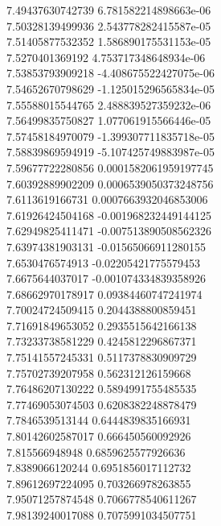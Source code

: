 {7.49437630742739 6.781582214898663e-06 \\
7.50328139499936 2.543778282415587e-05 \\
7.51405877532352 1.586890175531153e-05 \\
7.5270401369192 4.753717348648934e-06 \\
7.53853793909218 -4.408675522427075e-06 \\
7.54652670798629 -1.125015296565834e-05 \\
7.55588015544765 2.488839527359232e-06 \\
7.56499835750827 1.077061915566446e-05 \\
7.57458184970079 -1.399307711835718e-05 \\
7.58839869594919 -5.107425749883987e-05 \\
7.59677722280856 0.0001582061959197745 \\
7.60392889902209 0.0006539050373248756 \\
7.6113619166731 0.0007663932046853006 \\
7.61926424504168 -0.001968232449144125 \\
7.62949825411471 -0.007513890508562326 \\
7.63974381903131 -0.01565066911280155 \\
7.6530476574913 -0.02205421775579453 \\
7.6675644037017 -0.001074334839358926 \\
7.68662970178917 0.09384460747241974 \\
7.70024724509415 0.2044388800859451 \\
7.71691849653052 0.2935515642166138 \\
7.73233738581229 0.4245812296867371 \\
7.75141557245331 0.5117378830909729 \\
7.75702739207958 0.562312126159668 \\
7.76486207130222 0.5894991755485535 \\
7.77469053074503 0.6208382248878479 \\
7.7846539513144 0.6444839835166931 \\
7.80142602587017 0.666450560092926 \\
7.815566948948 0.6859625577926636 \\
7.8389066120244 0.6951856017112732 \\
7.89612697224095 0.703266978263855 \\
7.95071257874548 0.7066778540611267 \\
7.98139240017088 0.7075991034507751 \\
}
